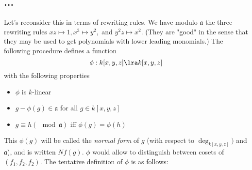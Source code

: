\subsection{...}
Let's reconsider this in terms of rewriting rules. We have
modulo $\mathfrak{a}$
the three rewriting rules $xz\mapsto 1, x^3\mapsto y^2,$
and $y^2z\mapsto x^2$. (They are "good" in the sense that 
they may be used to get polynomials with lower leading
monomials.) The following procedure defines a function
\[ \phi : k[x,y,z] \lra k[x,y,z]
\]
with the following properties
\begin{itemize}
\item $\phi$ is $k$-linear
\item $g-\phi(g)\in \mathfrak{a}$ for all $g\in k[x,y,z]$
\item $g\equiv h (\mod \mathfrak{a})$ iff $\phi(g) = \phi(h)$
\end{itemize}

This $\phi(g)$ will be called the \textit{normal form}
of $g$ (with respect to $\deg_{k[x,y,z]})$ and $\mathfrak{a}$),
and is written $Nf(g)$. $\phi$ would allow to distinguish
between cosets of $(f_1, f_2, f_2)$. The tentative definition
of $\phi$ is as follows:







